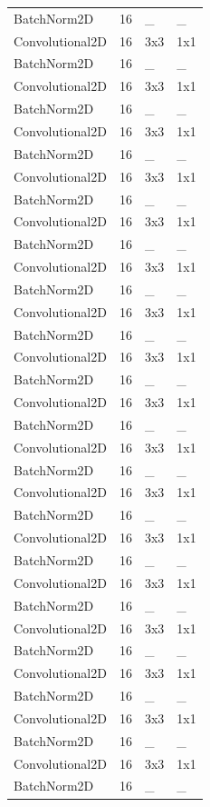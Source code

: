 \begin{center}
\begin{longtable}{|l|l|l|l|}
		BatchNorm2D & 16 & \_ & \_ \\
		Convolutional2D & 16 & 3x3 & 1x1 \\
		BatchNorm2D & 16 & \_ & \_ \\
		Convolutional2D & 16 & 3x3 & 1x1 \\
		BatchNorm2D & 16 & \_ & \_ \\
		Convolutional2D & 16 & 3x3 & 1x1 \\
		BatchNorm2D & 16 & \_ & \_ \\
		Convolutional2D & 16 & 3x3 & 1x1 \\
		BatchNorm2D & 16 & \_ & \_ \\
		Convolutional2D & 16 & 3x3 & 1x1 \\
		BatchNorm2D & 16 & \_ & \_ \\
		Convolutional2D & 16 & 3x3 & 1x1 \\
		BatchNorm2D & 16 & \_ & \_ \\
		Convolutional2D & 16 & 3x3 & 1x1 \\
		BatchNorm2D & 16 & \_ & \_ \\
		Convolutional2D & 16 & 3x3 & 1x1 \\
		BatchNorm2D & 16 & \_ & \_ \\
		Convolutional2D & 16 & 3x3 & 1x1 \\
		BatchNorm2D & 16 & \_ & \_ \\
		Convolutional2D & 16 & 3x3 & 1x1 \\
		BatchNorm2D & 16 & \_ & \_ \\
		Convolutional2D & 16 & 3x3 & 1x1 \\
		BatchNorm2D & 16 & \_ & \_ \\
		Convolutional2D & 16 & 3x3 & 1x1 \\
		BatchNorm2D & 16 & \_ & \_ \\
		Convolutional2D & 16 & 3x3 & 1x1 \\
		BatchNorm2D & 16 & \_ & \_ \\
		Convolutional2D & 16 & 3x3 & 1x1 \\
		BatchNorm2D & 16 & \_ & \_ \\
		Convolutional2D & 16 & 3x3 & 1x1 \\
		BatchNorm2D & 16 & \_ & \_ \\
		Convolutional2D & 16 & 3x3 & 1x1 \\
		BatchNorm2D & 16 & \_ & \_ \\
		Convolutional2D & 16 & 3x3 & 1x1 \\
		BatchNorm2D & 16 & \_ & \_ \\

\end{longtable}
\end{center}
